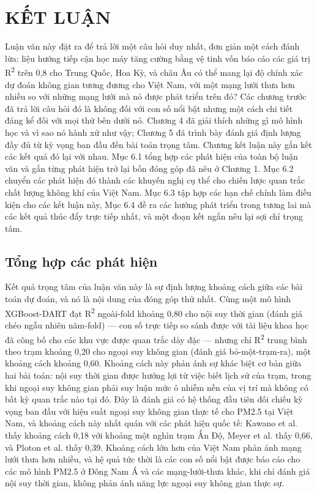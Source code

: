 \chapter{KẾT LUẬN}
\label{chuong6}


Luận văn này đặt ra để trả lời một câu hỏi duy nhất, đơn giản một cách đánh lừa: liệu hướng tiếp cận học máy tăng cường bằng vệ tinh vốn báo cáo các giá trị R\textsuperscript{2} trên 0,8 cho Trung Quốc, Hoa Kỳ, và châu Âu có thể mang lại độ chính xác dự đoán không gian tương đương cho Việt Nam, với một mạng lưới thưa hơn nhiều so với những mạng lưới mà nó được phát triển trên đó? Các chương trước đã trả lời câu hỏi đó là không đối với con số nổi bật nhưng một cách chi tiết đáng kể đối với mọi thứ bên dưới nó. Chương 4 đã giải thích những gì mô hình học và vì sao nó hành xử như vậy; Chương 5 đã trình bày đánh giá định lượng đầy đủ từ kỳ vọng ban đầu đến bài toán trọng tâm. Chương kết luận này gắn kết các kết quả đó lại với nhau. Mục 6.1 tổng hợp các phát hiện của toàn bộ luận văn và gắn từng phát hiện trở lại bốn đóng góp đã nêu ở Chương 1. Mục 6.2 chuyển các phát hiện đó thành các khuyến nghị cụ thể cho chiến lược quan trắc chất lượng không khí của Việt Nam. Mục 6.3 tập hợp các hạn chế chính làm điều kiện cho các kết luận này, Mục 6.4 đề ra các hướng phát triển trong tương lai mà các kết quả thúc đẩy trực tiếp nhất, và một đoạn kết ngắn nêu lại sợi chỉ trọng tâm.

\section{Tổng hợp các phát hiện}

Kết quả trọng tâm của luận văn này là sự định lượng khoảng cách giữa các bài toán dự đoán, và nó là nội dung của đóng góp thứ nhất. Cùng một mô hình XGBoost-DART đạt R\textsuperscript{2} ngoài-fold khoảng 0,80 cho nội suy thời gian (đánh giá chéo ngẫu nhiên năm-fold) --- con số trực tiếp so sánh được với tài liệu khoa học đã công bố cho các khu vực được quan trắc dày đặc --- nhưng chỉ R\textsuperscript{2} trung bình theo trạm khoảng 0,20 cho ngoại suy không gian (đánh giá bỏ-một-trạm-ra), một khoảng cách khoảng 0,60. Khoảng cách này phản ánh sự khác biệt cơ bản giữa hai bài toán: nội suy thời gian được hưởng lợi từ việc biết lịch sử của trạm, trong khi ngoại suy không gian phải suy luận mức ô nhiễm nền của vị trí mà không có bất kỳ quan trắc nào tại đó. Đây là đánh giá có hệ thống đầu tiên đối chiếu kỳ vọng ban đầu với hiệu suất ngoại suy không gian thực tế cho PM2.5 tại Việt Nam, và khoảng cách này nhất quán với các phát hiện quốc tế: Kawano et al. \cite{kawano2025} thấy khoảng cách 0,18 với khoảng một nghìn trạm Ấn Độ, Meyer et al. \cite{meyer2018} thấy 0,66, và Ploton et al. \cite{ploton2020} thấy 0,39. Khoảng cách lớn hơn của Việt Nam phản ánh mạng lưới thưa hơn nhiều, và hệ quả tức thời là các con số nổi bật được báo cáo cho các mô hình PM2.5 ở Đông Nam Á và các mạng-lưới-thưa khác, khi chỉ đánh giá nội suy thời gian, không phản ánh năng lực ngoại suy không gian thực sự.

